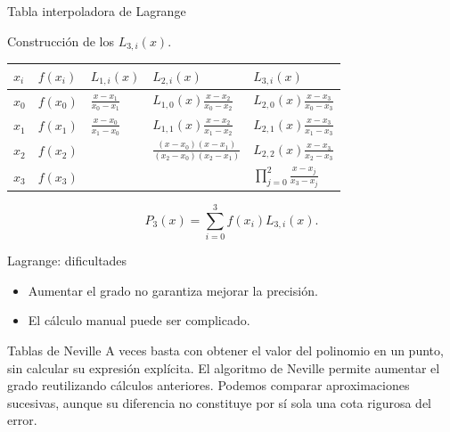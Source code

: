 \documentclass[original_version/main.tex]{subfiles}
\begin{document}
\begin{frame}[t]{Tabla interpoladora de Lagrange}
\par\noindent\begin{minipage}[t][12mm][t]{\textwidth}\small\strut Construcción de los $L_{3,i}(x)$.\end{minipage}\par\nointerlineskip
\begin{minipage}[t]{\textwidth}\begingroup\scriptsize\setlength{\tabcolsep}{3pt}\begin{center}\begin{tabular}{|C{.065\textwidth}|C{.095\textwidth}|C{.19\textwidth}|C{.25\textwidth}|C{.25\textwidth}|}\hline
\rule[-2mm]{0pt}{6mm}$x_i$&$f(x_i)$&$L_{1,i}(x)$&$L_{2,i}(x)$&$L_{3,i}(x)$\\\hline
\rule[-2.5mm]{0pt}{9mm}$x_0$&$f(x_0)$&$\frac{x-x_1}{x_0-x_1}$&$L_{1,0}(x)\frac{x-x_2}{x_0-x_2}$&$L_{2,0}(x)\frac{x-x_3}{x_0-x_3}$\\\hline
\rule[-2.5mm]{0pt}{9mm}$x_1$&$f(x_1)$&$\frac{x-x_0}{x_1-x_0}$&$L_{1,1}(x)\frac{x-x_2}{x_1-x_2}$&$L_{2,1}(x)\frac{x-x_3}{x_1-x_3}$\\\hline
\rule[-2.5mm]{0pt}{9mm}$x_2$&$f(x_2)$&&$\frac{(x-x_0)(x-x_1)}{(x_2-x_0)(x_2-x_1)}$&$L_{2,2}(x)\frac{x-x_3}{x_2-x_3}$\\\hline
\rule[-2.5mm]{0pt}{9mm}$x_3$&$f(x_3)$&&&$\prod_{j=0}^2\frac{x-x_j}{x_3-x_j}$\\\hline
\end{tabular}\end{center}\endgroup\par
\end{minipage}\par\[P_3(x)=\sum_{i=0}^3f(x_i)L_{3,i}(x).\]
\end{frame}
\begin{frame}[t]{Lagrange: dificultades}
\begin{itemize}
\item Aumentar el grado no garantiza mejorar la precisión.
\item El cálculo manual puede ser complicado.
\end{itemize}
\end{frame}
\begin{frame}[t]{Tablas de Neville}
A veces basta con obtener el valor del polinomio en un punto, sin calcular su expresión explícita.
\bigskip
El algoritmo de Neville permite aumentar el grado reutilizando cálculos anteriores.
\bigskip
Podemos comparar aproximaciones sucesivas, aunque su diferencia no constituye por sí sola una cota rigurosa del error.
\end{frame}
\end{document}
